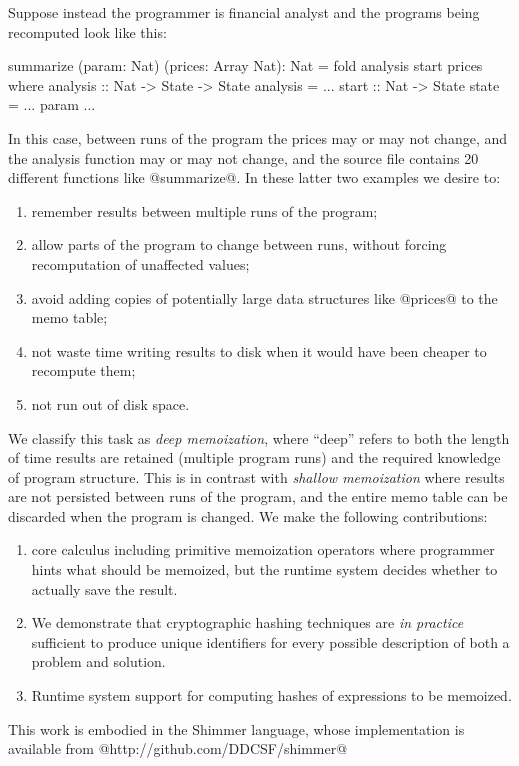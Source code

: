 \documentclass[acmsmall]{acmart}
\begin{document}
\eject
Suppose instead the programmer is financial analyst and the programs being recomputed look like this:
%
\begin{code}
  summarize (param: Nat) (prices: Array Nat): Nat
   = fold analysis start prices
   where analysis :: Nat -> State -> State
         analysis = ...
         start    :: Nat -> State
         state    = ... param ...
\end{code}
%
In this case, between runs of the program the prices may or may not change, and the analysis function may or may not change, and the source file contains 20 different functions like @summarize@. In these latter two examples we desire to:

\begin{enumerate}
\item remember results between multiple runs of the program;
\item allow parts of the program to change between runs, without forcing recomputation of unaffected values;
\item avoid adding copies of potentially large data structures like @prices@ to the memo table;
\item not waste time writing results to disk when it would have been cheaper to recompute them;
\item not run out of disk space.
\end{enumerate}

We classify this task as \emph{deep memoization}, where ``deep'' refers to both the length of time results are retained (multiple program runs) and the required knowledge of program structure. This is in contrast with \emph{shallow memoization} where results are not persisted between runs of the program, and the entire memo table can be discarded when the program is changed. We make the following contributions:

\begin{enumerate}
\item core calculus including primitive memoization operators where programmer hints what should be memoized, but the runtime system decides whether to actually save the result.

\item We demonstrate that cryptographic hashing techniques are \emph{in practice} sufficient to produce unique identifiers for every possible description of both a problem and solution.

\item Runtime system support for computing hashes of expressions to be memoized.

\end{enumerate}

This work is embodied in the Shimmer language, whose implementation is available from @http://github.com/DDCSF/shimmer@
\end{document}
